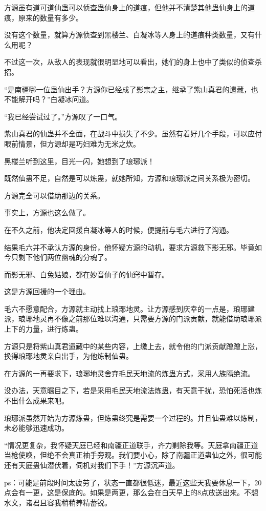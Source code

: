 \begin{this_body}
方源虽有道可道仙蛊可以侦查蛊仙身上的道痕，但他并不清楚其他蛊仙身上的道痕，原来的数量有多少。

没有这个数量，就算方源侦查到黑楼兰、白凝冰等人身上的道痕种类数量，又有什么用呢？

不过这一次，从敌人的表现就很明显地可以看出，她们的身上也中了类似的侦查杀招。

“是南疆哪一位蛊仙出手？方源你已经成了影宗之主，继承了紫山真君的遗藏，也不能解开吗？”白凝冰问道。

“我已经尝试过了。”方源叹了一口气。

紫山真君的仙蛊并不全面，在战斗中损失了不少。虽然有着好几个手段，可以应付眼前情景，但方源却是巧妇难为无米之炊。

黑楼兰听到这里，目光一闪，她想到了琅琊派！

既然仙蛊不足，自然是可以炼蛊，就她所知，方源和琅琊派之间关系极为密切。

方源完全可以借助那边的关系。

事实上，方源也这么做了。

在不久之前，他决定回援白凝冰等人的时候，便提前与毛六进行了沟通。

结果毛六并不承认方源的身份，他怀疑方源的动机，要求方源救下影无邪。毕竟如今只剩下他们两位幽魂的分魂了。

而影无邪、白兔姑娘，都在妙音仙子的仙窍中暂存。

这是方源回援的一个理由。

毛六不愿意配合，方源就主动找上琅琊地灵。让方源感到庆幸的一点是，琅琊建派，琅琊地灵再不像之前那位难以沟通，只需要方源的门派贡献，就能借助琅琊派上下的力量，进行炼蛊。

方源只是将紫山真君遗藏中的某些内容，上缴上去，就令他的门派贡献蹭蹭上涨，换得琅琊地灵亲自出手，为他炼制仙蛊。

在方源的一再要求下，琅琊地灵舍弃毛民天地流的炼蛊方式，采用人族隔绝流。

没办法，天意瞩目之下，若是采用毛民天地流法炼蛊，有天意干扰，恐怕死活也炼不出什么成果来吧。

琅琊派虽然开始为方源炼蛊，但炼蛊终究是需要一个过程的。并且仙蛊难以炼制，未必能够迅速成功。

“情况更复杂，我怀疑天庭已经和南疆正道联手，齐力剿除我等。天庭拿南疆正道当枪使唤，但绝不会真正袖手旁观。我们要小心，除了南疆正道蛊仙之外，很可能还有天庭蛊仙潜伏着，伺机对我们下手！”方源沉声道。

ps：可能是前段时间太疲劳了，状态一直都很低迷，最近这些天我要休息一下，20点会有一更，这是保底的。如果是两更，那么会在白天早上的8点放送出来。不想水文，诸君且容我稍稍养精蓄锐。

\end{this_body}

